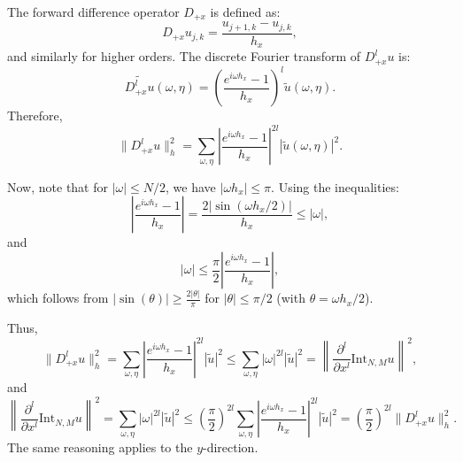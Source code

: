 \documentclass[12pt]{article}
\begin{document}
\begin{enumerate}
                The forward difference operator $D_{+x}$ is defined as:
                \begin{equation*}
                    D_{+x} u_{j,k} = \frac{u_{j+1,k} - u_{j,k}}{h_x},
                \end{equation*}
                and similarly for higher orders. The discrete Fourier transform of $D_{+x}^l u$ is:
                \begin{equation*}
                    \widetilde{D_{+x}^l u}(\omega, \eta) = \left( \frac{e^{i\omega h_x} - 1}{h_x} \right)^l \tilde{u}(\omega, \eta).
                \end{equation*}
                Therefore,
                \begin{equation*}
                    \|D_{+x}^l u\|_h^2 = \sum_{\omega,\eta} \left| \frac{e^{i\omega h_x} - 1}{h_x} \right|^{2l} |\tilde{u}(\omega, \eta)|^2.
                \end{equation*}

                Now, note that for $|\omega| \leq N/2$, we have $|\omega h_x| \leq \pi$. Using the inequalities:
                \begin{equation*}
                    \left| \frac{e^{i\omega h_x} - 1}{h_x} \right| = \frac{2|\sin(\omega h_x / 2)|}{h_x} \leq |\omega|,
                \end{equation*}
                and
                \begin{equation*}
                    |\omega| \leq \frac{\pi}{2} \left| \frac{e^{i\omega h_x} - 1}{h_x} \right|,
                \end{equation*}
                which follows from $|\sin(\theta)| \geq \frac{2|\theta|}{\pi}$ for $|\theta| \leq \pi/2$ (with $\theta = \omega h_x / 2$).

                Thus,
                \begin{equation*}
                    \|D_{+x}^l u\|_h^2 = \sum_{\omega,\eta} \left| \frac{e^{i\omega h_x} - 1}{h_x} \right|^{2l} |\tilde{u}|^2 \leq \sum_{\omega,\eta} |\omega|^{2l} |\tilde{u}|^2 = \left\| \frac{\partial^l}{\partial x^l} \text{Int}_{N,M} u \right\|^2,
                \end{equation*}
                and
                \begin{equation*}
                    \left\| \frac{\partial^l}{\partial x^l} \text{Int}_{N,M} u \right\|^2 = \sum_{\omega,\eta} |\omega|^{2l} |\tilde{u}|^2 \leq \left( \frac{\pi}{2} \right)^{2l} \sum_{\omega,\eta} \left| \frac{e^{i\omega h_x} - 1}{h_x} \right|^{2l} |\tilde{u}|^2 = \left( \frac{\pi}{2} \right)^{2l} \|D_{+x}^l u\|_h^2.
                \end{equation*}
                The same reasoning applies to the $y$-direction.
    \end{enumerate}
\end{document}
